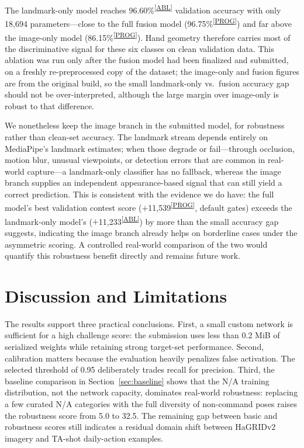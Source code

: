 \documentclass[10pt,twocolumn,a4paper]{article}
\newcommand{\evidence}[1]{\textsuperscript{\scriptsize[\hyperref[ev:#1]{#1}]}}
\newcommand{\result}[2]{#1\evidence{#2}}
\begin{document}
The landmark-only model reaches \result{96.60\%}{ABL} validation accuracy with
only 18{,}694 parameters---close to the full fusion model
(\result{96.75\%}{PROG}) and far above the image-only model
(\result{86.15\%}{PROG}). Hand geometry therefore carries most of the
discriminative signal for these six classes on clean validation data. This
ablation was run only after the fusion model had been finalized and submitted,
on a freshly re-preprocessed copy of the dataset; the image-only and fusion
figures are from the original build, so the small landmark-only vs.\ fusion
accuracy gap should not be over-interpreted, although the large margin over
image-only is robust to that difference.

We nonetheless keep the image branch in the submitted model, for robustness
rather than clean-set accuracy. The landmark stream depends entirely on
MediaPipe's landmark estimates; when those degrade or fail---through occlusion,
motion blur, unusual viewpoints, or detection errors that are common in
real-world capture---a landmark-only classifier has no fallback, whereas the
image branch supplies an independent appearance-based signal that can still
yield a correct prediction. This is consistent with the evidence we do have:
the full model's best validation contest score
(\result{$+$11{,}539}{PROG}, default gates) exceeds the landmark-only model's
(\result{$+$11{,}233}{ABL}) by more than the small accuracy gap suggests,
indicating the image branch already helps on borderline cases under the
asymmetric scoring. A controlled real-world comparison of the two would
quantify this robustness benefit directly and remains future work.

\section{Discussion and Limitations}
\label{sec:discussion}

The results support three practical conclusions. First, a small custom network
is sufficient for a high challenge score: the submission uses less than
0.2 MiB of serialized weights while retaining strong target-set performance.
Second, calibration matters because the evaluation heavily penalizes false
activation. The selected threshold of 0.95 deliberately trades recall for
precision. Third, the baseline comparison in Section~\ref{sec:baseline} shows
that the N/A training distribution, not the network capacity, dominates
real-world robustness: replacing a few curated N/A categories with the full
diversity of non-command poses raises the robustness score from 5.0 to 32.5.
The remaining gap between basic and robustness scores still indicates a
residual domain shift between HaGRIDv2 imagery and TA-shot daily-action
examples.
\end{document}
